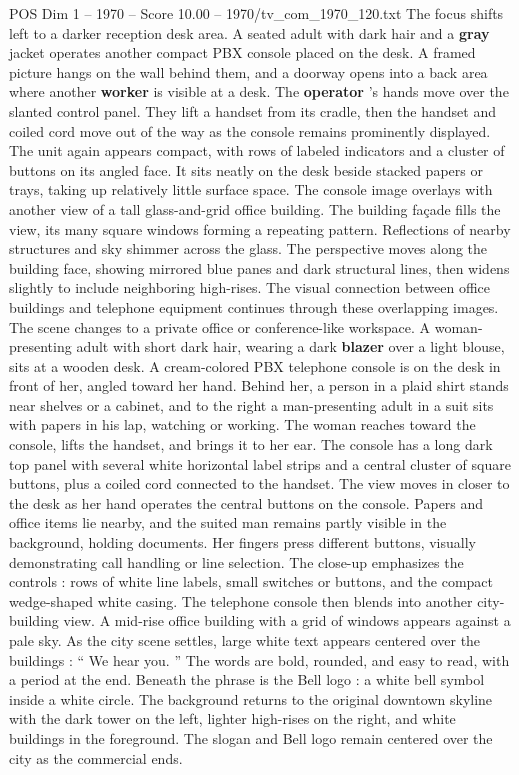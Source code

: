 \begin{textsample}{POS Dim 1 – 1970 – Score 10.00 – 1970/tv\_com\_1970\_120.txt}
The focus shifts left to a darker reception desk area.
A seated adult with dark hair and a \textbf{gray} jacket operates another compact PBX console placed on the desk.
A framed picture hangs on the wall behind them, and a doorway opens into a back area where another \textbf{worker} is visible at a desk.
The \textbf{operator} ’s hands move over the slanted control panel.
They lift a handset from its cradle, then the handset and coiled cord move out of the way as the console remains prominently displayed.
The unit again appears compact, with rows of labeled indicators and a cluster of buttons on its angled face.
It sits neatly on the desk beside stacked papers or trays, taking up relatively little surface space.
The console image overlays with another view of a tall glass-and-grid office building.
The building façade fills the view, its many square windows forming a repeating pattern.
Reflections of nearby structures and sky shimmer across the glass.
The perspective moves along the building face, showing mirrored blue panes and dark structural lines, then widens slightly to include neighboring high-rises.
The visual connection between office buildings and telephone equipment continues through these overlapping images.
The scene changes to a private office or conference-like workspace.
A woman-presenting adult with short dark hair, wearing a dark \textbf{blazer} over a light blouse, sits at a wooden desk.
A cream-colored PBX telephone console is on the desk in front of her, angled toward her hand.
Behind her, a person in a plaid shirt stands near shelves or a cabinet, and to the right a man-presenting adult in a suit sits with papers in his lap, watching or working.
The woman reaches toward the console, lifts the handset, and brings it to her ear.
The console has a long dark top panel with several white horizontal label strips and a central cluster of square buttons, plus a coiled cord connected to the handset.
The view moves in closer to the desk as her hand operates the central buttons on the console.
Papers and office items lie nearby, and the suited man remains partly visible in the background, holding documents.
Her fingers press different buttons, visually demonstrating call handling or line selection.
The close-up emphasizes the controls : rows of white line labels, small switches or buttons, and the compact wedge-shaped white casing.
The telephone console then blends into another city-building view.
A mid-rise office building with a grid of windows appears against a pale sky.
As the city scene settles, large white text appears centered over the buildings : “ We hear you. ” The words are bold, rounded, and easy to read, with a period at the end.
Beneath the phrase is the Bell logo : a white bell symbol inside a white circle.
The background returns to the original downtown skyline with the dark tower on the left, lighter high-rises on the right, and white buildings in the foreground.
The slogan and Bell logo remain centered over the city as the commercial ends.

\end{textsample}
